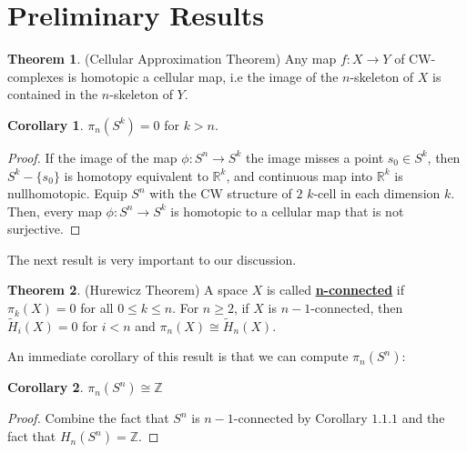 \documentclass{article}
\theoremstyle{definition}
\newtheorem{theorem}{Theorem}[section]
\theoremstyle{definition}
\theoremstyle{definition}
\theoremstyle{definition}
\theoremstyle{definition}
\newtheorem{corollary}{Corollary}[theorem]
\theoremstyle{definition}
\begin{document}
\section{Preliminary Results}

\begin{tcolorbox}[colback=red!5!white,colframe=red!30!white]
\begin{theorem}
(Cellular Approximation Theorem) Any map $f: X\to Y$ of CW-complexes is homotopic a cellular map, i.e the image of the $n$-skeleton of $X$ is contained in the $n$-skeleton of $Y$.
\end{theorem}
\end{tcolorbox}

\begin{tcolorbox}[colback=green!5!white,colframe=green!30!white]
\begin{corollary}
$\pi_n(S^k)=0$ for $k>n$.
\end{corollary}
\end{tcolorbox}
\begin{proof}
    If the image of the map $\phi: S^n\to S^k$ the image misses a point $s_0\in S^k$, then $S^k-\{s_0\}$ is homotopy equivalent to $\mathbb{R}^{k}$, and continuous map into $\mathbb{R}^{k}$ is nullhomotopic. Equip $S^n$ with the CW structure of $2$ $k$-cell in each dimension $k$. Then, every map $\phi: S^n\to S^k$ is homotopic to a cellular map that is not surjective.
\end{proof}

The next result is very important to our discussion. 

\begin{tcolorbox}[colback=red!5!white,colframe=red!30!white]
\begin{theorem}
(Hurewicz Theorem) A space $X$ is called \underline{\textbf{n-connected}} if $\pi_k(X)=0$ for all $0\leq k\leq n$. For $n\geq 2$, if $X$ is $n-1$-connected, then $\tilde{H}_i(X)=0$ for $i<n$ and  $\pi_n(X)\cong \tilde{H}_n(X)$.
\end{theorem}
\end{tcolorbox}
An immediate corollary of this result is that we can compute $\pi_n(S^n)$:
\begin{tcolorbox}[colback=green!5!white,colframe=green!30!white]
\begin{corollary}
$\pi_n(S^n)\cong \mathbb{Z}$
\end{corollary}
\end{tcolorbox}
\begin{proof}
    Combine the fact that $S^n$ is $n-1$-connected by Corollary $1.1.1$ and the fact that $H_n(S^n)=\mathbb{Z}$.
\end{proof}
\end{document}
